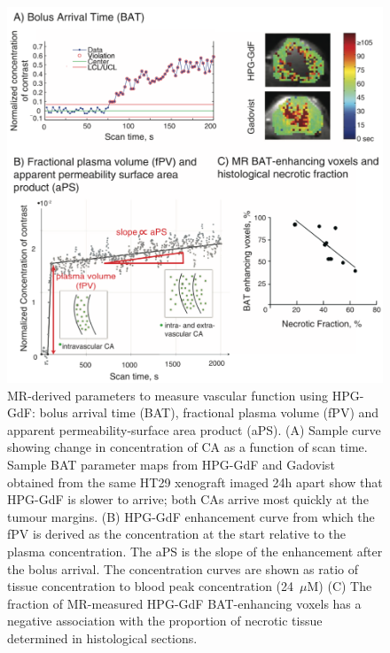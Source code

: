 \begin{figure}[htbp]
 \begin{center}
 \includegraphics[width=\textwidth]{hpg/hpg-paper1-images/hpg_fig2-bat.png}
 \caption{MR-derived parameters to measure vascular function using \acs{HPG-GdF}: bolus arrival time (\acs{BAT}), fractional plasma volume (\acs{fPV}) and apparent permeability-surface area product (\acs{aPS}). (A) Sample curve showing change in concentration of \acs{CA} as a function of scan time. 
 Sample \acs{BAT} parameter maps from \acs{HPG-GdF} and Gadovist obtained from the same HT29 xenograft imaged 24h apart show that \acs{HPG-GdF} is slower to arrive; both \acs{CA}s arrive most quickly at the tumour margins. (B) \acs{HPG-GdF} enhancement curve from which the \acs{fPV} is derived as the concentration at the start relative to the plasma concentration. The \acs{aPS} is the slope of the enhancement after the bolus arrival. The concentration curves are shown as ratio of tissue concentration to blood peak concentration (24~$\mu$M) (C) The fraction of MR-measured \acs{HPG-GdF} \acs{BAT}-enhancing voxels has a negative association with the proportion of necrotic tissue determined in histological sections.}
 \label{hpgpaper1:fig2}
 \end{center}
\end{figure}

